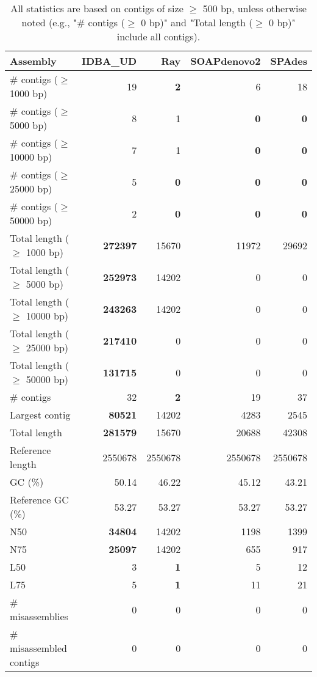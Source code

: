 \documentclass[12pt,a4paper]{article}
\begin{document}
\begin{table}[ht]
\begin{center}
\caption{All statistics are based on contigs of size $\geq$ 500 bp, unless otherwise noted (e.g., "\# contigs ($\geq$ 0 bp)" and "Total length ($\geq$ 0 bp)" include all contigs).}
\begin{tabular}{|l*{4}{|r}|}
\hline
Assembly & IDBA\_UD & Ray & SOAPdenovo2 & SPAdes \\ \hline
\# contigs ($\geq$ 1000 bp) & 19 & {\bf 2} & 6 & 18 \\ \hline
\# contigs ($\geq$ 5000 bp) & 8 & 1 & {\bf 0} & {\bf 0} \\ \hline
\# contigs ($\geq$ 10000 bp) & 7 & 1 & {\bf 0} & {\bf 0} \\ \hline
\# contigs ($\geq$ 25000 bp) & 5 & {\bf 0} & {\bf 0} & {\bf 0} \\ \hline
\# contigs ($\geq$ 50000 bp) & 2 & {\bf 0} & {\bf 0} & {\bf 0} \\ \hline
Total length ($\geq$ 1000 bp) & {\bf 272397} & 15670 & 11972 & 29692 \\ \hline
Total length ($\geq$ 5000 bp) & {\bf 252973} & 14202 & 0 & 0 \\ \hline
Total length ($\geq$ 10000 bp) & {\bf 243263} & 14202 & 0 & 0 \\ \hline
Total length ($\geq$ 25000 bp) & {\bf 217410} & 0 & 0 & 0 \\ \hline
Total length ($\geq$ 50000 bp) & {\bf 131715} & 0 & 0 & 0 \\ \hline
\# contigs & 32 & {\bf 2} & 19 & 37 \\ \hline
Largest contig & {\bf 80521} & 14202 & 4283 & 2545 \\ \hline
Total length & {\bf 281579} & 15670 & 20688 & 42308 \\ \hline
Reference length & 2550678 & 2550678 & 2550678 & 2550678 \\ \hline
GC (\%) & 50.14 & 46.22 & 45.12 & 43.21 \\ \hline
Reference GC (\%) & 53.27 & 53.27 & 53.27 & 53.27 \\ \hline
N50 & {\bf 34804} & 14202 & 1198 & 1399 \\ \hline
N75 & {\bf 25097} & 14202 & 655 & 917 \\ \hline
L50 & 3 & {\bf 1} & 5 & 12 \\ \hline
L75 & 5 & {\bf 1} & 11 & 21 \\ \hline
\# misassemblies & 0 & 0 & 0 & 0 \\ \hline
\# misassembled contigs & 0 & 0 & 0 & 0 \\ \hline

\end{tabular}
\end{center}
\end{table}
\end{document}
